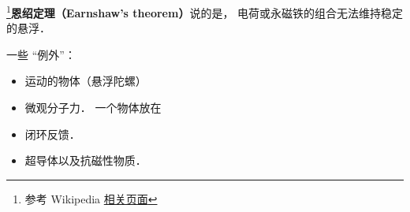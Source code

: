 
\begin{issues}
\issueDraft
\end{issues}

\footnote{参考 Wikipedia \href{https://en.wikipedia.org/wiki/Earnshaw's_theorem}{相关页面}}\textbf{恩绍定理（Earnshaw's theorem）}说的是， 电荷或永磁铁的组合无法维持稳定的悬浮．

一些 “例外”：
\begin{itemize}
\item 运动的物体（悬浮陀螺）
\item 微观分子力． 一个物体放在
\item 闭环反馈．
\item 超导体以及抗磁性物质．
\end{itemize}
